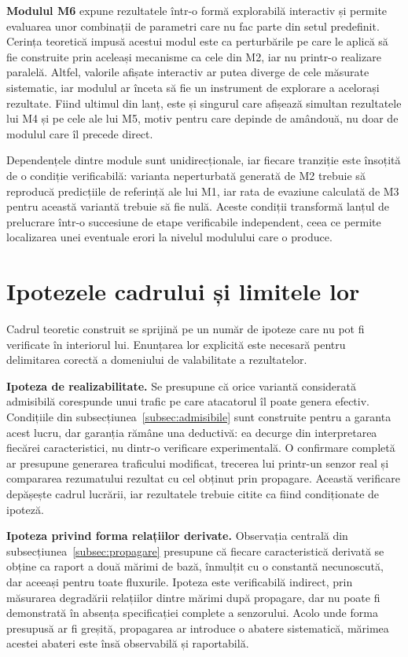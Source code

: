 \textbf{Modulul M6} expune rezultatele într-o formă explorabilă interactiv și permite evaluarea unor combinații de parametri care nu fac parte din setul predefinit. Cerința teoretică impusă acestui modul este ca perturbările pe care le aplică să fie construite prin aceleași mecanisme ca cele din M2, iar nu printr-o realizare paralelă. Altfel, valorile afișate interactiv ar putea diverge de cele măsurate sistematic, iar modulul ar înceta să fie un instrument de explorare a acelorași rezultate. Fiind ultimul din lanț, este și singurul care afișează simultan rezultatele lui M4 și pe cele ale lui M5, motiv pentru care depinde de amândouă, nu doar de modulul care îl precede direct.

Dependențele dintre module sunt unidirecționale, iar fiecare tranziție este însoțită de o condiție verificabilă: varianta neperturbată generată de M2 trebuie să reproducă predicțiile de referință ale lui M1, iar rata de evaziune calculată de M3 pentru această variantă trebuie să fie nulă. Aceste condiții transformă lanțul de prelucrare într-o succesiune de etape verificabile independent, ceea ce permite localizarea unei eventuale erori la nivelul modulului care o produce.

\section{Ipotezele cadrului și limitele lor}\label{sec:ipoteze}

Cadrul teoretic construit se sprijină pe un număr de ipoteze care nu pot fi verificate în interiorul lui. Enunțarea lor explicită este necesară pentru delimitarea corectă a domeniului de valabilitate a rezultatelor.

\textbf{Ipoteza de realizabilitate.} Se presupune că orice variantă considerată admisibilă corespunde unui trafic pe care atacatorul îl poate genera efectiv. Condițiile din subsecțiunea~\ref{subsec:admisibile} sunt construite pentru a garanta acest lucru, dar garanția rămâne una deductivă: ea decurge din interpretarea fiecărei caracteristici, nu dintr-o verificare experimentală. O confirmare completă ar presupune generarea traficului modificat, trecerea lui printr-un senzor real și compararea rezumatului rezultat cu cel obținut prin propagare. Această verificare depășește cadrul lucrării, iar rezultatele trebuie citite ca fiind condiționate de ipoteză.

\textbf{Ipoteza privind forma relațiilor derivate.} Observația centrală din subsecțiun\-ea~\ref{subsec:propagare} presupune că fiecare caracteristică derivată se obține ca raport a două mărimi de bază, înmulțit cu o constantă necunoscută, dar aceeași pentru toate fluxurile. Ipoteza este verificabilă indirect, prin măsurarea degradării relațiilor dintre mărimi după propagare, dar nu poate fi demonstrată în absența specificației complete a senzorului. Acolo unde forma presupusă ar fi greșită, propagarea ar introduce o abatere sistematică, mărimea acestei abateri este însă observabilă și raportabilă.

